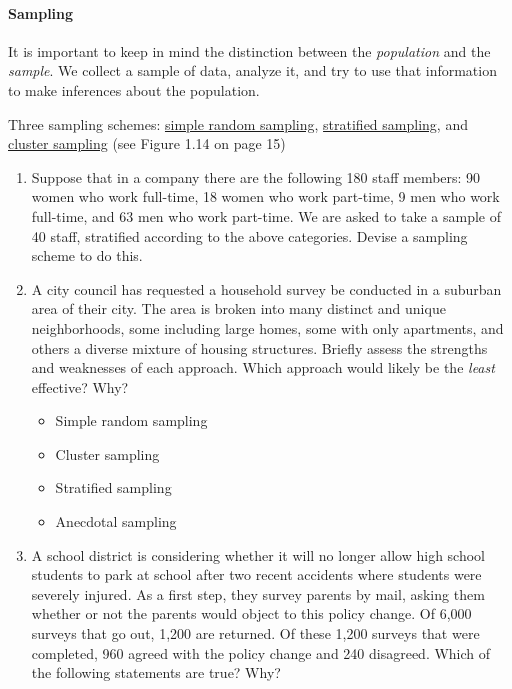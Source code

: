\documentclass[10pt]{article}\usepackage[]{graphicx}\usepackage[]{color}
\begin{document}
\paragraph{Sampling}

It is important to keep in mind the distinction between the \emph{population} and the \emph{sample}. We collect a sample of data, analyze it, and try to use that information to make inferences about the population. 

Three sampling schemes: \href{http://en.wikipedia.org/wiki/Simple_random_sampling}{simple random sampling}, \href{http://en.wikipedia.org/wiki/Stratified_sampling}{stratified sampling}, and \href{http://en.wikipedia.org/wiki/Cluster_sampling}{cluster sampling} (see Figure 1.14 on page 15)

\begin{enumerate}
  \item Suppose that in a company there are the following 180 staff members: 90 women who work full-time, 18 women who work part-time, 9 men who work full-time, and 63 men who work part-time. We are asked to take a sample of 40 staff, stratified according to the above categories. Devise a sampling scheme to do this. 
  \vspace{1.2in}
  \item A city council has requested a household survey be conducted in a suburban area of their city. The area is broken into many distinct and unique neighborhoods, some including large homes, some with only apartments, and others a diverse mixture of housing structures. Briefly assess the strengths and weaknesses of each approach. Which approach would likely be the \emph{least} effective? Why?
  \begin{itemize}
  \itemsep0.25in
\item Simple random sampling
\item{Cluster sampling}
\item Stratified sampling
\item Anecdotal sampling
\end{itemize}

  \item A school district is considering whether it will no longer allow high school students to park at school after two recent accidents where students were severely injured. As a first step, they survey parents by mail, asking them whether or not the parents would object to this policy change. Of 6,000 surveys that go out, 1,200 are returned. Of these 1,200 surveys that were completed, 960 agreed with the policy change and 240 disagreed. Which of the following statements are true? Why?


\end{enumerate}
\end{document}
